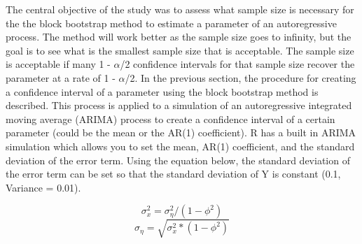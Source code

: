 \documentclass[12pt, letterpaper, titlepage]{article}
\begin{document}
The central objective of the study was to assess what sample size is necessary for the the block bootstrap method to estimate a parameter of an autoregressive process. The method will work better as the sample size goes to infinity, but the goal is to see what is the smallest sample size that is acceptable. The sample size is acceptable if many 1 - $\alpha$/2 confidence intervals for that sample size recover the parameter at a rate of 1 - $\alpha$/2. In the previous section, the procedure for creating a confidence interval of a parameter using the block bootstrap method is described. This process is applied to a simulation of an autoregressive integrated moving average (ARIMA) process to create a confidence interval of a certain parameter (could be the mean or the AR(1) coefficient). R has a built in ARIMA simulation which allows you to set the mean, AR(1) coefficient, and the standard deviation of the error term. Using the equation below, the standard deviation of the error term can be set so that the standard deviation of Y is constant (0.1, Variance = 0.01). 

\[ \sigma_{x}^{2}=\sigma_{\eta}^{2}/\left( 1-\phi^2 \right)\]
\[\sigma_{\eta}=\sqrt{\sigma_{x}^{2}*\left( 1-\phi^2 \right)}\]
\end{document}
